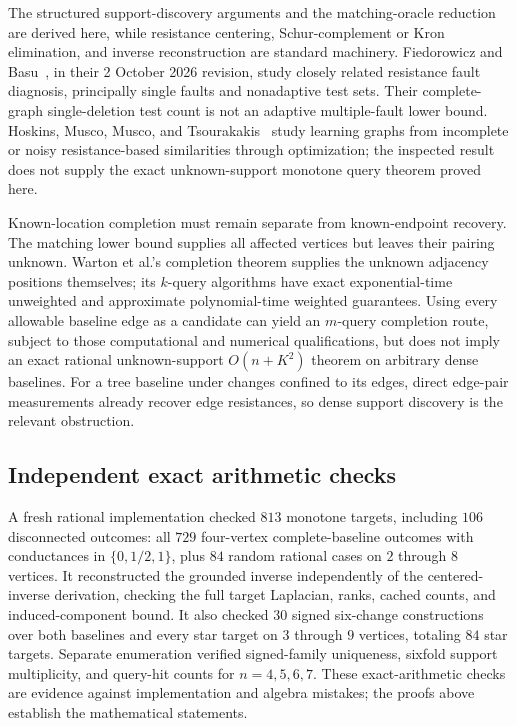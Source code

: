 \documentclass[11pt,letterpaper]{article}
\begin{document}
The structured support-discovery arguments and the matching-oracle reduction are derived here, while resistance centering, Schur-complement or Kron elimination, and inverse reconstruction are standard machinery. Fiedorowicz and Basu~\cite{FB}, in their 2 October 2026 revision, study closely related resistance fault diagnosis, principally single faults and nonadaptive test sets. Their complete-graph single-deletion test count is not an adaptive multiple-fault lower bound. Hoskins, Musco, Musco, and Tsourakakis~\cite{HMMT} study learning graphs from incomplete or noisy resistance-based similarities through optimization; the inspected result does not supply the exact unknown-support monotone query theorem proved here.

Known-location completion must remain separate from known-endpoint recovery. The matching lower bound supplies all affected vertices but leaves their pairing unknown. Warton et al.'s completion theorem supplies the unknown adjacency positions themselves; its $k$-query algorithms have exact exponential-time unweighted and approximate polynomial-time weighted guarantees. Using every allowable baseline edge as a candidate can yield an $m$-query completion route, subject to those computational and numerical qualifications, but does not imply an exact rational unknown-support $O(n+K^2)$ theorem on arbitrary dense baselines. For a tree baseline under changes confined to its edges, direct edge-pair measurements already recover edge resistances, so dense support discovery is the relevant obstruction.

\subsection{Independent exact arithmetic checks}
A fresh rational implementation checked $813$ monotone targets, including $106$ disconnected outcomes: all $729$ four-vertex complete-baseline outcomes with conductances in $\{0,1/2,1\}$, plus $84$ random rational cases on $2$ through $8$ vertices. It reconstructed the grounded inverse independently of the centered-inverse derivation, checking the full target Laplacian, ranks, cached counts, and induced-component bound. It also checked $30$ signed six-change constructions over both baselines and every star target on $3$ through $9$ vertices, totaling $84$ star targets. Separate enumeration verified signed-family uniqueness, sixfold support multiplicity, and query-hit counts for $n=4,5,6,7$. These exact-arithmetic checks are evidence against implementation and algebra mistakes; the proofs above establish the mathematical statements.
\end{document}
